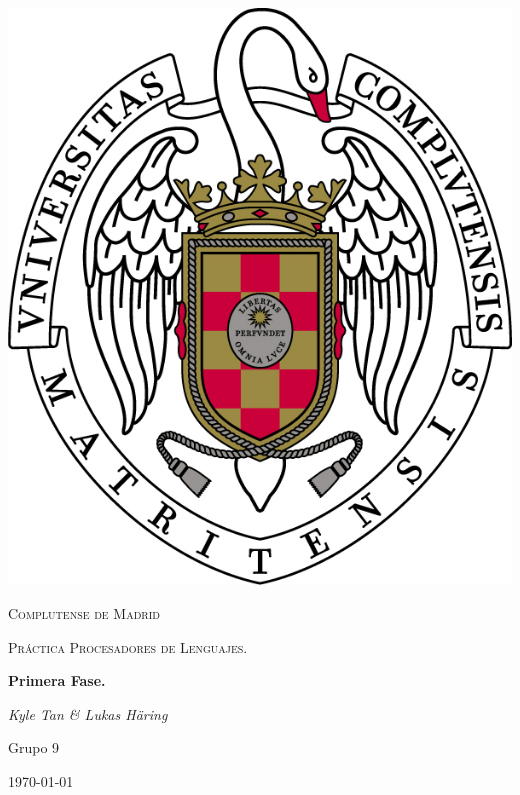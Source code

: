 \documentclass{article}
\begin{document}
\usetikzlibrary{automata,arrows, positioning}
\renewcommand{\contentsname}{Tabla de contenidos}

\begin{titlepage}
	\begin{center}
		\includegraphics{escudo.jpg}
	\end{center}
	\centering
	{\scshape\LARGE Complutense de Madrid \par}
	\vspace{1cm}
	{\scshape\Large Práctica Procesadores de Lenguajes.\par}
	\vspace{1.5cm}
	{\huge\bfseries Primera Fase. \par}
	\vspace{2cm}
	{\Large\itshape Kyle Tan \& Lukas Häring\par}
	{\large Grupo 9\par}
	\vfill
	\vfill

	{\large \today\par}
\end{titlepage}

\tableofcontents
\end{document}
